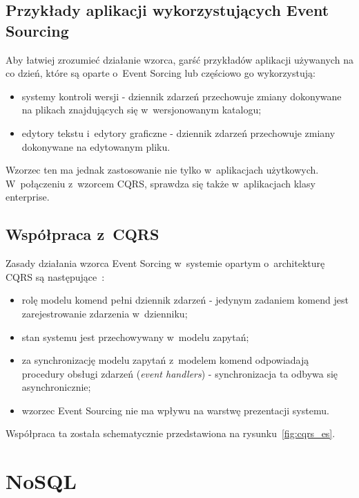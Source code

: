 \subsection{Przykłady aplikacji wykorzystujących Event Sourcing}

Aby łatwiej zrozumieć działanie wzorca, garść przykładów aplikacji używanych na co dzień, które są oparte o~Event Sorcing lub częściowo go wykorzystują:

\begin{itemize}
 \item systemy kontroli wersji - dziennik zdarzeń przechowuje zmiany dokonywane na plikach znajdujących się w~wersjonowanym katalogu;
 \item edytory tekstu i~edytory graficzne - dziennik zdarzeń przechowuje zmiany dokonywane na edytowanym pliku.
\end{itemize}

Wzorzec ten ma jednak zastosowanie nie tylko w~aplikacjach użytkowych.
W~połączeniu z~wzorcem CQRS, sprawdza się także w~aplikacjach klasy enterprise.


\subsection{Współpraca z~CQRS}

Zasady działania wzorca Event Sorcing w~systemie opartym o~architekturę CQRS są następujące~\cite{cqrs_es}:

\begin{itemize}
 \item rolę modelu komend pełni dziennik zdarzeń - jedynym zadaniem komend jest zarejestrowanie zdarzenia w~dzienniku;
 \item stan systemu jest przechowywany w~modelu zapytań;
 \item za synchronizację modelu zapytań z~modelem komend odpowiadają procedury obsługi zdarzeń (\emph{event handlers}) - synchronizacja ta odbywa się asynchronicznie;
 \item wzorzec Event Sourcing nie ma wpływu na warstwę prezentacji systemu.
\end{itemize}


Współpraca ta została schematycznie przedstawiona na rysunku~\ref{fig:cqrs_es}.




\section{NoSQL}

